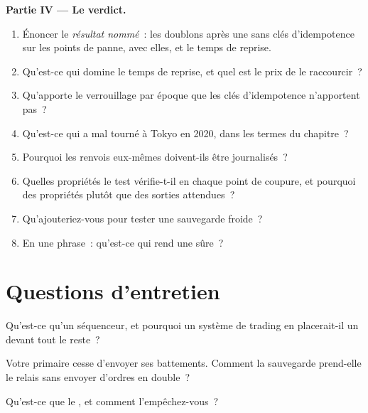 \begin{problem}
\medskip\noindent\textbf{Partie IV --- Le verdict.}
\begin{enumerate}[resume]
\item Énoncer le \emph{résultat nommé}~: les doublons après une  sans clés d'idempotence sur les points de panne, avec elles,
et le temps de reprise.
\item Qu'est-ce qui domine le temps de reprise, et quel est le prix de le raccourcir~?
\item Qu'apporte le verrouillage par époque que les clés d'idempotence n'apportent pas~?
\item Qu'est-ce qui a mal tourné à Tokyo en 2020, dans les termes du chapitre~?
\item Pourquoi les renvois eux-mêmes doivent-ils être journalisés~?
\item Quelles propriétés le test vérifie-t-il en chaque point de coupure, et pourquoi des propriétés plutôt que des sorties attendues~?
\item Qu'ajouteriez-vous pour tester une sauvegarde froide~?
\item En une phrase~: qu'est-ce qui rend une  sûre~?
\end{enumerate}
\end{problem}

\section{Questions d'entretien}

\begin{interviewq}\label{iq:ll:resilience:1}
Qu'est-ce qu'un séquenceur, et pourquoi un système de trading en placerait-il un devant tout le reste~?
\end{interviewq}

\begin{interviewq}\label{iq:ll:resilience:2}
Votre primaire cesse d'envoyer ses battements. Comment la sauvegarde prend-elle le relais sans envoyer d'ordres en double~?
\end{interviewq}

\begin{interviewq}\label{iq:ll:resilience:3}
Qu'est-ce que le , et comment l'empêchez-vous~?
\end{interviewq}

